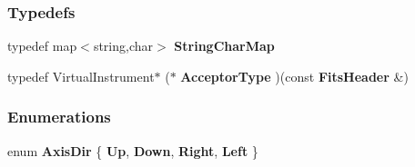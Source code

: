 \subsubsection*{Typedefs}
\begin{CompactItemize}
\item 
{}
typedef map$<$string,char$>$ {\bf String\-Char\-Map}\label{fitstoad_cc_a4}

\item 
{}
typedef Virtual\-Instrument$\ast$ ($\ast$ {\bf Acceptor\-Type} )(const {\bf Fits\-Header} \&)\label{fitstoad_cc_a5}

\end{CompactItemize}
\subsubsection*{Enumerations}
\begin{CompactItemize}
\item 
enum {\bf Axis\-Dir} \{ {\bf Up}, 
{\bf Down}, 
{\bf Right}, 
{\bf Left}
 \}
\end{CompactItemize}
